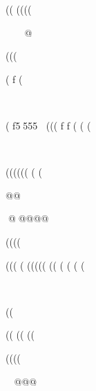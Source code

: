 ((
((((        







@









(((



(          f (



(  f5555          (((   f f  ( (  (




















((((((
(
(

@@



@@@@@






((((








(((
( ((((( (( (
(  (  
(
 



                
((






(( ((
((















((((



















@@@
























